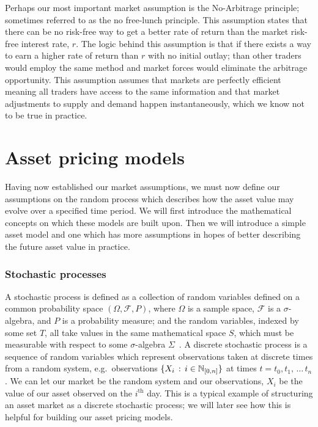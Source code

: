 Perhaps our most important market assumption is the No-Arbitrage principle; sometimes referred to as the no free-lunch principle. This assumption states that there can be no risk-free way to get a better rate of return than the market risk-free interest rate, \(r\). The logic behind this assumption is that if there exists a way to earn a higher rate of return than \(r\) with no initial outlay; than other traders would employ the same method and market forces would eliminate the arbitrage opportunity. This assumption assumes that markets are perfectly efficient meaning all traders have access to the same information and that market adjustments to supply and demand happen instantaneously, which we know not to be true in practice.

\section{Asset pricing models}

Having now established our market assumptions, we must now define our assumptions on the random process which describes how the asset value may evolve over a specified time period. We will first introduce the mathematical concepts on which these models are built upon. Then we will introduce a simple asset model and one which has more assumptions in hopes of better describing the future asset value in practice.

\subsubsection{Stochastic processes}

A stochastic process is defined as a collection of random variables defined on a common probability space \( (\Omega ,\mathcal{F},P) \), where \( \Omega \)  is a sample space, \( \mathcal{F} \) is a \( \sigma \)-algebra, and \( P \) is a probability measure; and the random variables, indexed by some set \( T \), all take values in the same mathematical space \(S\), which must be measurable with respect to some \( \sigma \)-algebra \( \Sigma \)~\cite{lamperti1977stochastic}.
\nline{}
A discrete stochastic process is a sequence of random variables which represent observations taken at discrete times from a random system, e.g.\ observations \( \{X_i\,:\, i \in \mathbb{N}_{[0,n]}\} \) at times \( t = t_0,t_1,\,\dots \,t_n \). We can let our market be the random system and our observations, \( X_i \) be the value of our asset observed on the \( i^\text{th}\) day. This is a typical example of structuring an asset market as a discrete stochastic process; we will later see how this is helpful for building our asset pricing models.

